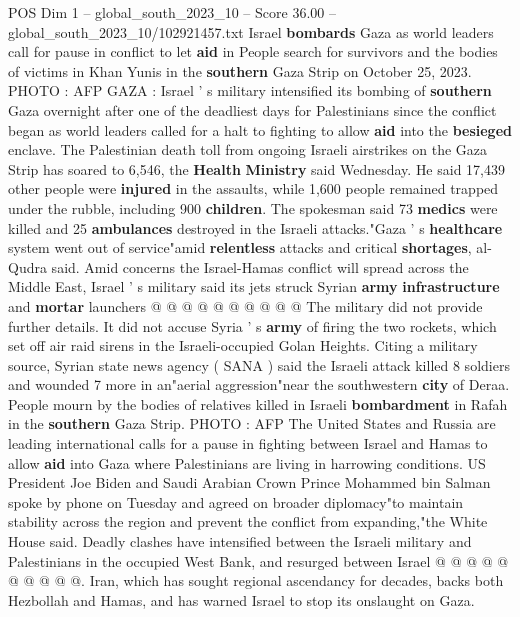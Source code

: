 \begin{textsample}{POS Dim 1 – global\_south\_2023\_10 – Score 36.00 – global\_south\_2023\_10/102921457.txt}  \label{ex:f1_pos_186}
Israel \textbf{bombards} Gaza as world leaders call for pause in conflict to let \textbf{aid} in People search for survivors and the bodies of victims in Khan Yunis in the \textbf{southern} Gaza Strip on October 25, 2023.
PHOTO : AFP GAZA : Israel ' s military intensified its bombing of \textbf{southern} Gaza overnight after one of the deadliest days for Palestinians since the conflict began as world leaders called for a halt to fighting to allow \textbf{aid} into the \textbf{besieged} enclave.
The Palestinian death toll from ongoing Israeli airstrikes on the Gaza Strip has soared to 6,546, the \textbf{Health} \textbf{Ministry} said Wednesday.
He said 17,439 other people were \textbf{injured} in the assaults, while 1,600 people remained trapped under the rubble, including 900 \textbf{children}.
The spokesman said 73 \textbf{medics} were killed and 25 \textbf{ambulances} destroyed in the Israeli attacks."Gaza ' s \textbf{healthcare} system went out of service"amid \textbf{relentless} attacks and critical \textbf{shortages}, al-Qudra said.
Amid concerns the Israel-Hamas conflict will spread across the Middle East, Israel ' s military said its jets struck Syrian \textbf{army} \textbf{infrastructure} and \textbf{mortar} launchers @ @ @ @ @ @ @ @ @ @ The military did not provide further details.
It did not accuse Syria ' s \textbf{army} of firing the two rockets, which set off air raid sirens in the Israeli-occupied Golan Heights.
Citing a military source, Syrian state news agency ( SANA ) said the Israeli attack killed 8 soldiers and wounded 7 more in an"aerial aggression"near the southwestern \textbf{city} of Deraa.
People mourn by the bodies of relatives killed in Israeli \textbf{bombardment} in Rafah in the \textbf{southern} Gaza Strip.
PHOTO : AFP The United States and Russia are leading international calls for a pause in fighting between Israel and Hamas to allow \textbf{aid} into Gaza where Palestinians are living in harrowing conditions.
US President Joe Biden and Saudi Arabian Crown Prince Mohammed bin Salman spoke by phone on Tuesday and agreed on broader diplomacy"to maintain stability across the region and prevent the conflict from expanding,"the White House said.
Deadly clashes have intensified between the Israeli military and Palestinians in the occupied West Bank, and resurged between Israel @ @ @ @ @ @ @ @ @ @.
Iran, which has sought regional ascendancy for decades, backs both Hezbollah and Hamas, and has warned Israel to stop its onslaught on Gaza.

\end{textsample}
